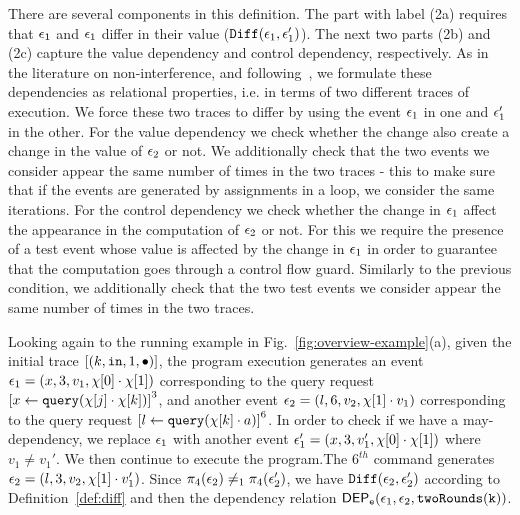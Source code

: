 There are several components in this definition. The part with label (2a) requires that $\mathtt{\epsilon}_1$ and $\mathtt{\epsilon}_1$ differ in their value ($\mathtt{Diff}(\mathtt{\epsilon}_1, \mathtt{\epsilon}_1')$).
The next two parts (2b) and (2c) capture the value dependency and control dependency, respectively.
As in the literature on non-interference, and following~\cite{Cousot19a}, we formulate these dependencies as relational properties, i.e. in terms of two different traces of execution. 
We force these two traces to differ by using the event $\mathtt{\epsilon}_1$ in one and $\mathtt{\epsilon}_1'$ in the other. 
For the value dependency we check whether the change also create a change in the value of $\mathtt{\epsilon}_2$ or not. We additionally check that the two events we consider appear the same number of times in the two traces - this to make sure that if the events are generated by assignments in a loop, we consider the same iterations. 
For the control dependency we check whether the change in $\mathtt{\epsilon}_1$ affect the appearance in the computation of $\mathtt{\epsilon}_2$ or not. 
For this we require the presence of a test event whose value is affected by the change in $\mathtt{\epsilon}_1$
in order to guarantee that the computation goes through a control flow guard.
Similarly to the previous condition, we additionally check that the two test events we consider appear the same number of times in the two traces.
% 

Looking  again to the running example in Fig.~\ref{fig:overview-example}(a), given the initial trace $[ (k, \mathtt{in}, 1, \bullet)]$,
the program execution generates an
event $\mathtt{\epsilon}_1 = (x, 3, v_1, \chi[0] \cdot \chi[1])$ corresponding to the query request
$\clabel{\assign{x}{\query(\chi[j] \cdot \chi[k])} }^{3}$,
and another event
$\mathtt{\epsilon}_2 = (l, 6, v_2, \chi[1] \cdot v_1 )$ corresponding to the query request
$\clabel{\assign{l}{\query(\chi[k] \cdot a)} }^{6}$.
In order to check if we have a may-dependency, we replace $\mathtt{\epsilon}_1$ with another event $\mathtt{\epsilon}_1' = (x, 3, v_1', \chi[0] \cdot \chi[1])$
where $v_1 \neq v_1'$.
We then continue to execute the program.The $6^{th}$ command generates $\mathtt{\epsilon}_2 = (l, 3, v_2, \chi[1] \cdot v_1' )$.
Since $\pi_4(\mathtt{\epsilon}_2) \neq_1 \pi_4(\mathtt{\epsilon}_2')$, we have  $\mathtt{Diff}(\mathtt{\epsilon}_2, \mathtt{\epsilon}_2')$ according to Definition~\ref{def:diff} and then the dependency relation $\mathsf{DEP_{\mathtt{e}}}(\mathtt{\epsilon}_1, \mathtt{\epsilon}_2, \mathtt{twoRounds(k)})$.


